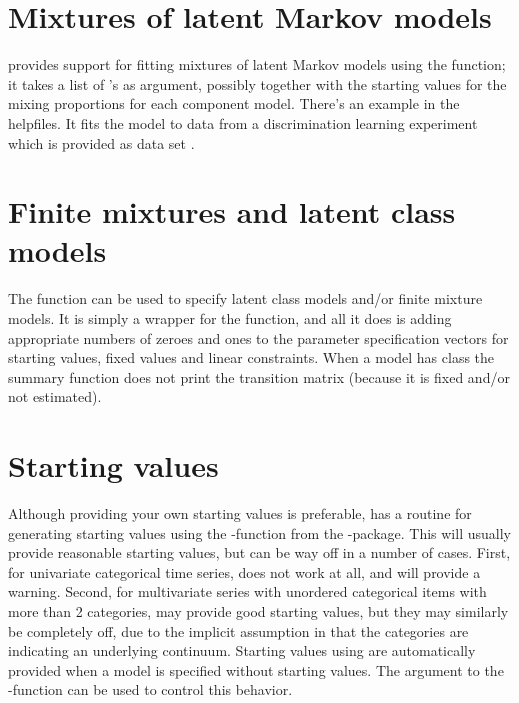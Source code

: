 \section{Mixtures of latent Markov models}

 provides support for fitting mixtures of latent Markov
models using the  function; it takes a list of
's as argument, possibly together with the starting values
for the mixing proportions for each component model.  There's an
example in the helpfiles.  It fits the model to data from a
discrimination learning experiment which is provided as data set
 \cite{Raijmakers2001}. 

\section{Finite mixtures and latent class models}

The function  can be used to specify latent class models
and/or finite mixture models.  It is simply a wrapper for the
 function, and all it does is adding appropriate numbers of
zeroes and ones to the parameter specification vectors for starting
values, fixed values and linear constraints.  When a model has class
 the summary function does not print the transition matrix
(because it is fixed and/or not estimated).


\section{Starting values}

Although providing your own starting values is preferable,
 has a routine for generating starting values using the
-function from the -package.  This will
usually provide reasonable starting values, but can be way off in a
number of cases.  First, for univariate categorical time series,
 does not work at all, and  will provide a
warning.  Second, for multivariate series with unordered categorical
items with more than 2 categories,  may provide good
starting values, but they may similarly be completely off, due to the
implicit assumption in  that the categories are
indicating an underlying continuum.  Starting values using
 are automatically provided when a model is specified
without starting values.  The argument  to the
-function can be used to control this behavior.

